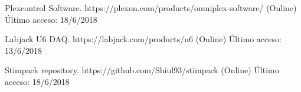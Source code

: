 \documentclass[conference]{IEEEtran}
\begin{document}
\begin{thebibliography}{00}
 Plexcontrol Software. https://plexon.com/products/omniplex-software/ (Online) Último acceso: 18/6/2018

 Labjack U6 DAQ. https://labjack.com/products/u6 (Online) Último acceso: 13/6/2018




 Stimpack repository. https://github.com/Shiul93/stimpack (Online) Último acceso: 18/6/2018

\end{thebibliography}
\vspace{12pt}
\end{document}
